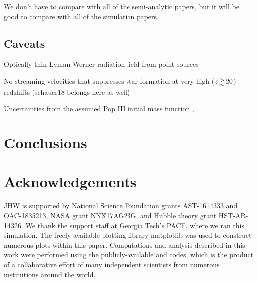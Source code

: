 \documentclass[a4paper,fleqn,usenatbib]{mnras}
\begin{document}
\li We don't have to compare with all of the semi-analytic papers, but
it will be good to compare with all of the simulation papers.

\subsection{Caveats}

\li Optically-thin Lyman-Werner radiation field from point sources \citep{Schauer17}

\li No streaming velocities that suppresses star formation at very
high ($z \ga 20$) redshifts \citep{Tselia11, Greif11_Delay, Naoz12, OLeary12} (schauer18 belongs here as well)

\li Uncertainties from the assumed Pop III initial mass function 
,
\section{Conclusions}

\section*{Acknowledgements}

JHW is supported by National Science Foundation grants AST-1614333 and
OAC-1835213, NASA grant NNX17AG23G, and Hubble theory grant
HST-AR-14326.  We thank the support staff at Georgia Tech's PACE,
where we ran this simulation.  The freely available plotting library
{\sc matplotlib} \citep{matplotlib} was used to construct numerous
plots within this paper. Computations and analysis described in this
work were performed using the publicly-available \enzo{} and \yt{}
codes, which is the product of a collaborative effort of many
independent scientists from numerous institutions around the world.





\end{document}
